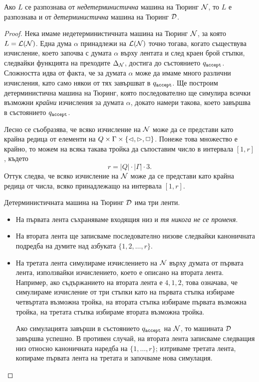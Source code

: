 \begin{framed}
  \begin{thm}
    Ако $L$ се разпознава от {\em недетерминистична} машина на Тюринг $\mathcal{N}$, то $L$
    е разпознава и от {\em детерминистична} машина на Тюринг $\mathcal{D}$.
  \end{thm}
\end{framed}
\begin{proof}
  Нека имаме недетерминистичната машина на Тюринг $\mathcal{N}$, за която $L = \mathcal{L}(\mathcal{N})$.
  Една дума $\alpha$ принадлежи на $\mathcal{L}(\mathcal{N})$ точно тогава, когато съществува изчисление,
  което започва с думата $\alpha$ върху лентата и след краен брой стъпки, следвайки функцията на преходите $\Delta_{\mathcal{N}}$,
  достига до състоянието $q_{\texttt{accept}}$.
  Сложността идва от факта, че за думата $\alpha$ може да имаме много различни изчисления, 
  като само някои от тях завършват в $q_{\texttt{accept}}$. Ще построим детерминистична машина на Тюринг,
  която последователно ще симулира всички възможни {\em крайни} изчисления за думата $\alpha$, докато 
  намери такова, което завършва в състоянието $q_{\texttt{accept}}$.
  
  Лесно се съобразява, че всяко изчисление на $\mathcal{N}$ може да се представи като 
  крайна редица от елементи на $Q \times \Gamma \times \{\lhd,\rhd,\Box\}$.
  Понеже това множество е крайно, то можем на всяка такава тройка да
  съпоставим число в интервала $[1,r]$, където 
  \[r = |Q| \cdot |\Gamma| \cdot 3.\]
  Оттук следва, че всяко изчисление на $\mathcal{N}$ може да се представи като крайна 
  редица от числа, всяко принадлежащо на интервала $[1,r]$.

  Детерминистичната машина на Тюринг $\mathcal{D}$ има три ленти.
  
  \begin{itemize}
  \item 
    На първата лента съхраняваме входящия низ и {\em тя никога не се променя}.
  \item
    На втората лента ще записваме последователно низове следвайки каноничната подредба на 
    думите над азбуката $\{1,2,\dots,r\}$.
  \item
    На третата лента симулираме изчислението на $\mathcal{N}$ върху думата от първата лента, използвайки изчислението, 
    което е описано на втората лента. Например, ако съдържанието на втората лента е $4,1,2$,
    това означава, че симулираме изчисление от три стъпки като на първата стъпка избираме четвъртата
    възможна тройка, на втората стъпка избираме първата възможна тройка, на третата стъпка избираме втората възможна тройка.
    
    Ако симулацията завърши в състоянието $q_{\texttt{accept}}$ на $\mathcal{N}$, то машината $\mathcal{D}$ завършва успешно.
    В противен случай, на втората лента записваме следващия низ относно каноничната наредба на $\{1,\dots,r\}$; изтриваме третата лента, копираме първата лента на третата и започваме нова симулация.
  \end{itemize}
\end{proof}

